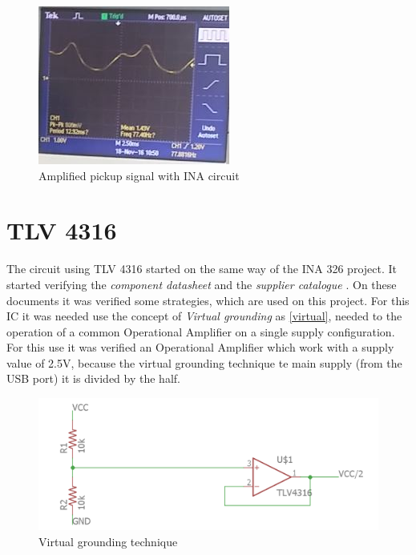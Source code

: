 \begin{figure}[!htpb]
\centering
\caption{Amplified pickup signal with INA circuit}
\label{INA_result}
\includegraphics[scale=1]{images/INA_result}
\end{figure}

\section{TLV 4316}
\label{TLV_Circuit}
The circuit using TLV 4316 started on the same way of the INA 326 project.
It started verifying the \textit{component datasheet} \cite{TLV4316} and the \textit{supplier catalogue} \cite{OpAmps}.
On these documents it was verified some strategies, which are used on this project. For this IC it was needed use the
concept of \textit{Virtual grounding} \cite{OpAmps} as \autoref{virtual}, needed to the operation of a common Operational Amplifier on a single
supply configuration. For this use it was verified an Operational Amplifier which work with a supply value of 2.5V, because
the virtual grounding technique te main supply (from the USB port) it is divided by the half.\\

\begin{figure}[!htpb]
\centering
\caption{Virtual grounding technique}
\label{virtual}
\includegraphics[scale=0.3]{images/virtual}
\end{figure}

